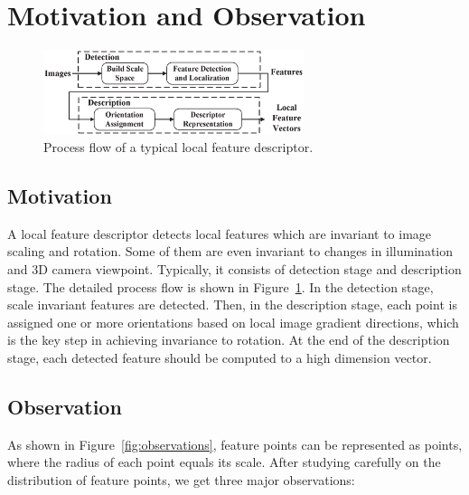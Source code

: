 \section{Motivation and Observation}
\label{sec:observation}

\begin{figure}
	\centering
	\includegraphics[width=3.0in]{images/fig-workflow.eps}
	\caption{Process flow of a typical local feature descriptor.}
	\label{fig:workflow}
\end{figure}

\subsection{Motivation}

A local feature descriptor detects local features which are invariant to image scaling and rotation. Some of them are even invariant to changes in illumination and 3D camera viewpoint. Typically, it consists of detection stage and description stage. The detailed process flow is shown in Figure~\ref{fig:workflow}. In the detection stage, scale invariant features are detected. Then, in the description stage, each point is assigned one or more orientations based on local image gradient directions, which is the key step in achieving invariance to rotation. At the end of the description stage, each detected feature should be computed to a high dimension vector. 

\subsection{Observation}

As shown in Figure~\ref{fig:observations}, feature points can be represented as points, where the radius of each point equals its scale. After studying carefully on the distribution of feature points, we get three major observations:

